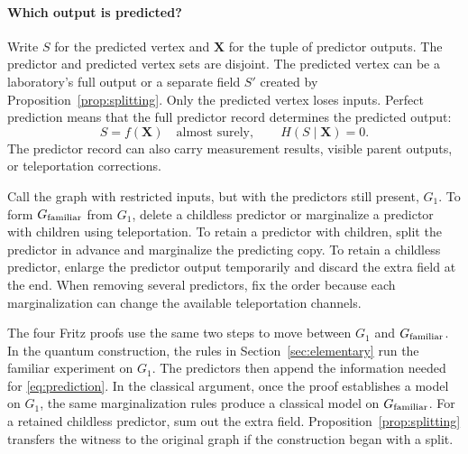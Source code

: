 \paragraph{Which output is predicted?}
Write \(S\) for the predicted vertex and \(\mathbf X\) for the tuple of
predictor outputs. The predictor and predicted vertex sets are disjoint.
The predicted vertex can be a laboratory's full output or a separate
field \(S'\) created by Proposition~\ref{prop:splitting}. Only the
predicted vertex loses inputs. Perfect prediction means that the full
predictor record determines the predicted output:
\begin{equation}
  S=f(\mathbf X)\quad\text{almost surely},\qquad H(S\mid\mathbf X)=0 .
  \label{eq:prediction}
\end{equation}
The predictor record can also carry measurement results, visible parent
outputs, or teleportation corrections.

Call the graph with restricted inputs, but with the predictors still
present, \(G_1\). To form \(G_{\text{familiar}}\) from \(G_1\), delete a childless
predictor or marginalize a predictor with children using teleportation.
To retain a predictor with children, split the predictor in advance and
marginalize the predicting copy. To retain a childless predictor, enlarge
the predictor output temporarily and discard the extra field at the end.
When removing several predictors, fix the order because each
marginalization can change the available teleportation channels.

The four Fritz proofs use the same two steps to move between \(G_1\) and
\(G_{\text{familiar}}\). In the quantum construction, the rules in
Section~\ref{sec:elementary} run the familiar experiment on \(G_1\).
The predictors then append the information needed for
\eqref{eq:prediction}. In the classical argument, once the proof
establishes a model on \(G_1\), the same marginalization rules produce a
classical model on \(G_{\text{familiar}}\). For a retained childless predictor,
sum out the extra field. Proposition~\ref{prop:splitting} transfers the
witness to the original graph if the construction began with a split.

